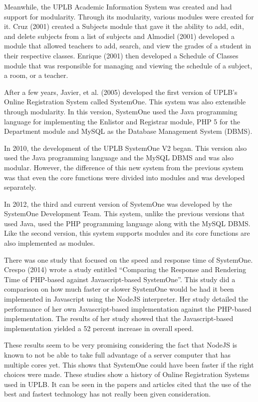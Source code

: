 \documentclass{sigchi}
\begin{document}
Meanwhile, the UPLB Academic Information System was created and had support for
modularity. Through its modularity, various modules were created for it. Cruz (2001) created a
Subjects module that gave it the ability to add, edit, and delete subjects from a list of subjects and
Almodiel (2001) developed a module that allowed teachers to add, search, and view the grades of
a student in their respective classes. Enrique (2001) then developed a Schedule of Classes
module that was responsible for managing and viewing the schedule of a subject, a room, or a
teacher.

After a few years, Javier, et al. (2005) developed the first version of UPLB’s Online
Registration System called SystemOne. This system was also extensible through modularity. In
this version, SystemOne used the Java programming language for implementing the Enlistor and
Registrar module, PHP 5 for the Department module and MySQL as the Database Management
System (DBMS).

In 2010, the development of the UPLB SystemOne V2 began. This version also
used the Java programming language and the MySQL DBMS and was also modular. However,
the difference of this new system from the previous system was that even the core functions were
divided into modules and was developed separately.

In 2012, the third and current version of SystemOne was developed by the SystemOne
Development Team. This system, unlike the previous versions that used Java, used the PHP
programming language along with the MySQL DBMS. Like the second version, this system
supports modules and its core functions are also implemented as modules.

There was one study that focused on the speed and response time of SystemOne. Crespo
(2014) wrote a study entitled “Comparing the Response and Rendering Time of PHP-based
against Javascript-based SystemOne”. This study did a comparison on how much faster or slower
SystemOne would be had it been implemented in Javascript using the NodeJS interpreter. Her
study detailed the performance of her own Javascript-based implementation against the
PHP-based implementation. The results of her study showed that the Javascript-based
implementation yielded a 52 percent increase in overall speed.

These results seem to be very promising considering the fact that NodeJS is known to not be
able to take full advantage of a server computer that has multiple cores yet. This shows that
SystemOne could have been faster if the right choices were made.
These studies show a history of Online Registration Systems used in UPLB. It can be seen in
the papers and articles cited that the use of the best and fastest technology has not really been
given consideration.
\end{document}
